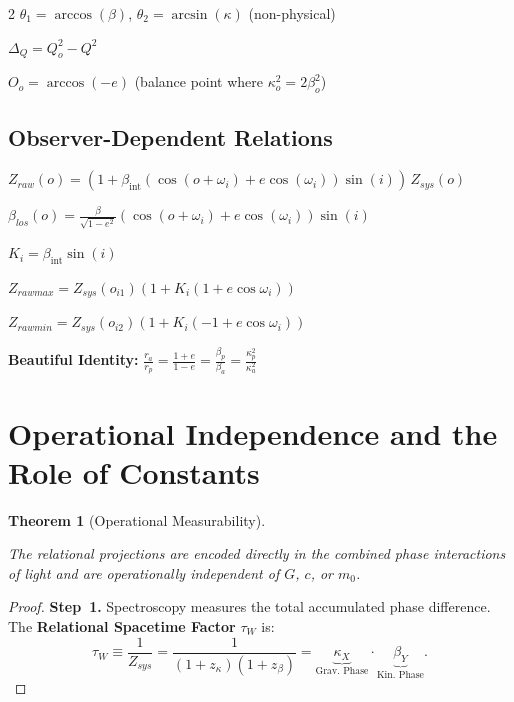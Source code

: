\documentclass[10pt, a4paper]{article}
\newtheorem{theorem}{Theorem}[section]
\begin{document}
\begin{multicols}{2}
$\theta_{1} = \arccos(\beta)$, \quad $\theta_{2} = \arcsin(\kappa)$ \quad (non-physical)

$\Delta_{Q} = Q_{o}^{2}-Q^{2}$

$O_{o} = \arccos(-e)$ (balance point where $\kappa_o^2=2\beta_o^2$)

\subsection{Observer-Dependent Relations}

$Z_{raw}(o)=(1+\beta_{\text{int}}(\cos(o+\omega_{i})+e\cos(\omega_{i}))\sin(i))\,Z_{sys}(o)$

$\beta_{los}(o)=\frac{\beta}{\sqrt{1-e^{2}}}(\cos(o+\omega_{i})+e\cos(\omega_{i}))\sin(i)$

$K_{i}=\beta_{\text{int}}\sin(i)$

$Z_{rawmax}=Z_{sys}(o_{i1})(1+K_{i}(1+e\cos\omega_{i}))$

$Z_{rawmin}=Z_{sys}(o_{i2})(1+K_{i}(-1+e\cos\omega_{i}))$

\textbf{Beautiful Identity:}
$\frac{r_{a}}{r_{p}}=\frac{1+e}{1-e}=\frac{\beta_{p}}{\beta_{a}}=\frac{\kappa_{p}^{2}}{\kappa_{a}^{2}}$



\section{Operational Independence and the Role of Constants}
\hypertarget{sec:operational}{}\label{sec:operational}

\begin{theorem}[Operational Measurability]
\hypertarget{thm:operational}{}\label{thm:operational}
The relational projections are encoded directly in the combined phase interactions of light and are operationally independent of $G$, $c$, or $m_0$.
\end{theorem}

\begin{proof}
\textbf{Step~1.} Spectroscopy measures the total accumulated phase difference. The \textbf{Relational Spacetime Factor} $\tau_W$ is:
\hypertarget{eq:tau_observable}{}\label{eq:tau_observable}
\begin{equation}
\tau_W \equiv \frac{1}{Z_{sys}} = \frac{1}{(1+z_{\kappa})(1+z_{\beta})}
= \underbrace{\kappa_X}_{\text{Grav.\ Phase}} \cdot \underbrace{\beta_Y}_{\text{Kin.\ Phase}}.
\end{equation}


\end{proof}
\end{multicols}
\end{document}
